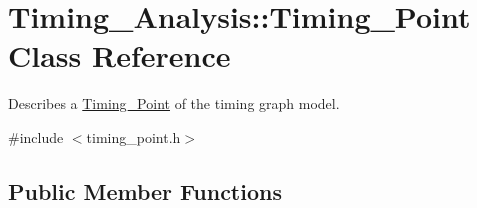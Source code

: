 \hypertarget{classTiming__Analysis_1_1Timing__Point}{\section{Timing\-\_\-\-Analysis\-:\-:Timing\-\_\-\-Point Class Reference}
\label{classTiming__Analysis_1_1Timing__Point}
}


Describes a \hyperlink{classTiming__Analysis_1_1Timing__Point}{Timing\-\_\-\-Point} of the timing graph model.  




{\ttfamily \#include $<$timing\-\_\-point.\-h$>$}

\subsection*{Public Member Functions}

